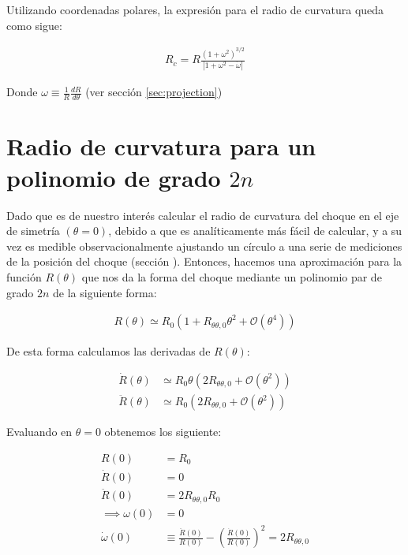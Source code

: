 Utilizando coordenadas polares, la expresión para el radio de curvatura queda como sigue:

\begin{align}
R_c = R\frac{\left(1 + \omega^2\right)^{3/2}}{\left|1 + \omega^2 - \dot{\omega}\right|}\label{eq:Rc-generic}
\end{align}

Donde $\omega \equiv \frac{1}{R}\frac{dR}{d\theta}$ (ver sección \ref{sec:projection})

\section{Radio de curvatura para un polinomio de grado $2n$}
\label{app:curvature-radius-poly}

Dado que es de nuestro interés calcular el radio de curvatura del choque en el eje de simetría
$(\theta=0)$, debido a que es analíticamente más fácil de calcular, y a su vez es medible
observacionalmente ajustando un círculo a una serie de mediciones de la posición del choque (sección ).
Entonces, hacemos una aproximación para la función $R(\theta)$ que nos da la forma del choque
mediante un polinomio par de grado $2n$ de la siguiente forma:

\begin{align}
R(\theta) \simeq R_0\left(1 + R_{\theta \theta, 0}\theta^2 + \mathcal{O}(\theta^4)\right)
\end{align}

De esta forma calculamos las derivadas de $R(\theta)$:

\begin{align}
  \dot{R}(\theta) &\simeq R_0\theta\left(2R_{\theta \theta, 0} + \mathcal{O}(\theta^2)\right) \\
  \ddot{R}(\theta) &\simeq R_0\left(2R_{\theta \theta, 0} + \mathcal{O}(\theta^2)\right)
\end{align}

Evaluando en $\theta = 0$ obtenemos los siguiente:

\begin{align}
  R(0) &= R_0 \\
  \dot{R}(0) &= 0 \\
  \ddot{R}(0) &= 2R_{\theta \theta, 0} R_0 \\
  \implies \omega(0) &= 0 \\
  \dot{\omega}(0) &\equiv \frac{\ddot{R}(0)}{R(0)} - \left(\frac{\dot{R}(0)}{R(0)}\right)^2 = 2R_{\theta \theta, 0}
\end{align}

